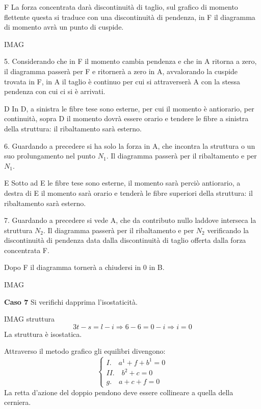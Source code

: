 \documentclass{article}
\begin{document}
\begin{adjustwidth}{2in}{}
	\item[F] La forza concentrata darà discontinuità di taglio, sul grafico di momento flettente questa si traduce con una discontinuità di pendenza, in F il diagramma di momento avrà un punto di cuspide. 
	
	IMAG
	
	\item[5.] Considerando che in F il momento cambia pendenza e che in A ritorna a zero, il diagramma passerà per F e ritornerà a zero in A, avvalorando la cuspide trovata in F, in A il taglio è continuo per cui si attraverserà A con la stessa pendenza con cui ci si è arrivati. 
	
	\item[D] In D, a sinistra le fibre tese sono esterne, per cui il momento è antiorario, per continuità, sopra D il momento dovrà essere orario e tendere le fibre a sinistra della struttura: il ribaltamento sarà esterno. 
	
	\item[6.] Guardando a precedere si ha solo la forza in A, che incontra la struttura o un suo prolungamento nel punto $N_1$. Il diagramma passerà per il ribaltamento e per $N_1$. 
	
	\item[E] Sotto ad E le fibre tese sono esterne, il momento sarà perciò antiorario, a destra di E il momento sarà orario e tenderà le fibre superiori della struttura: il ribaltamento sarà esterno. 
	
	\item[7.] Guardando a precedere si vede A, che da contributo nullo laddove interseca la struttura $N_2$. Il diagramma passerà per il ribaltamento e per $N_2$ verificando la discontinuità di pendenza data dalla discontinuità di taglio offerta dalla forza concentrata F. 
	
	Dopo F il diagramma tornerà a chiudersi in 0 in B. 
	
	IMAG
	
	\textbf{Caso 7}\newline 
	Si verifichi dapprima l'isostaticità. 
	
	IMAG struttura 
	\[3t-s=l-i\Rightarrow 6 - 6 = 0-i \Rightarrow i=0\]
	La struttura è isostatica. \newline 
	
	Attraverso il metodo grafico gli equilibri divengono: 
		\[\begin{cases}
		I.\quad a^1 +f + b^1 = 0\\
		II.\quad b^2+c = 0 \\
		g.\quad a+c+f = 0
		\end{cases}\]
	La retta d'azione del doppio pendono deve essere collineare a quella della cerniera.
	

\end{adjustwidth}
\end{document}
